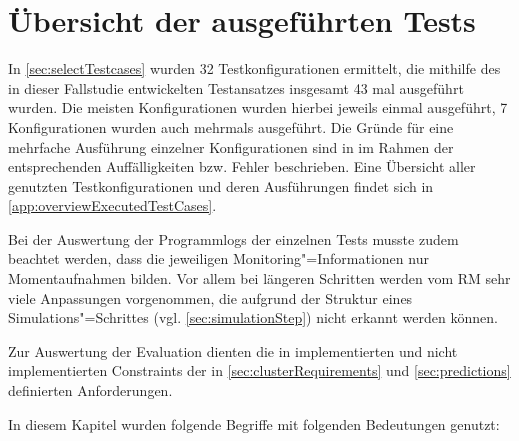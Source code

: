 \section{Übersicht der ausgeführten Tests}
\label{sec:overviewExecTestCases}

In \autoref{sec:selectTestcases} wurden 32 Testkonfigurationen ermittelt, die mithilfe des in dieser Fallstudie entwickelten Testansatzes insgesamt 43 mal ausgeführt wurden.
Die meisten Konfigurationen wurden hierbei jeweils einmal ausgeführt, 7 Konfigurationen wurden auch mehrmals ausgeführt.
Die Gründe für eine mehrfache Ausführung einzelner Konfigurationen sind in im Rahmen der entsprechenden Auffälligkeiten bzw. Fehler beschrieben.
Eine Übersicht aller genutzten Testkonfigurationen und deren Ausführungen findet sich in \autoref{app:overviewExecutedTestCases}.

Bei der Auswertung der Programmlogs der einzelnen Tests musste zudem beachtet werden, dass die jeweiligen Monitoring"=Informationen nur Momentaufnahmen bilden.
Vor allem bei längeren Schritten werden vom \ac{RM} sehr viele Anpassungen vorgenommen, die aufgrund der Struktur eines Simulations"=Schrittes (vgl. \autoref{sec:simulationStep}) nicht erkannt werden können.

Zur Auswertung der Evaluation dienten die in  implementierten und nicht implementierten Constraints der in \autoref{sec:clusterRequirements} und \autoref{sec:predictions} definierten Anforderungen.

In diesem Kapitel wurden folgende Begriffe mit folgenden Bedeutungen genutzt:

